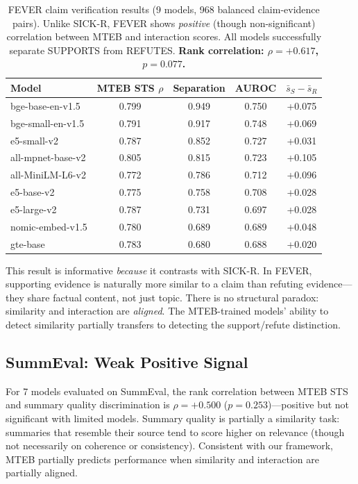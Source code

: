 \documentclass{article}
\begin{document}
\begin{table}[t]
\centering
\caption{FEVER claim verification results (9 models, 968 balanced claim-evidence pairs). Unlike SICK-R, FEVER shows \emph{positive} (though non-significant) correlation between MTEB and interaction scores. All models successfully separate SUPPORTS from REFUTES. \textbf{Rank correlation: $\rho = +0.617$, $p = 0.077$.}}
\label{tab:fever_results}
\small
\begin{tabular}{@{}lcccc@{}}
\toprule
\textbf{Model} & \textbf{MTEB STS $\rho$} & \textbf{Separation} & \textbf{AUROC} & $\bar{s}_S - \bar{s}_R$ \\
\midrule
bge-base-en-v1.5    & 0.799 & 0.949 & 0.750 & +0.075 \\
bge-small-en-v1.5   & 0.791 & 0.917 & 0.748 & +0.069 \\
e5-small-v2         & 0.787 & 0.852 & 0.727 & +0.031 \\
all-mpnet-base-v2   & 0.805 & 0.815 & 0.723 & +0.105 \\
all-MiniLM-L6-v2    & 0.772 & 0.786 & 0.712 & +0.096 \\
e5-base-v2          & 0.775 & 0.758 & 0.708 & +0.028 \\
e5-large-v2         & 0.787 & 0.731 & 0.697 & +0.028 \\
nomic-embed-v1.5    & 0.780 & 0.689 & 0.689 & +0.048 \\
gte-base            & 0.783 & 0.680 & 0.688 & +0.020 \\
\bottomrule
\end{tabular}
\end{table}

This result is informative \emph{because} it contrasts with SICK-R. In FEVER, supporting evidence is naturally more similar to a claim than refuting evidence---they share factual content, not just topic. There is no structural paradox: similarity and interaction are \emph{aligned}. The MTEB-trained models' ability to detect similarity partially transfers to detecting the support/refute distinction.

\subsection{SummEval: Weak Positive Signal}

For 7 models evaluated on SummEval, the rank correlation between MTEB STS and summary quality discrimination is $\rho = +0.500$ ($p = 0.253$)---positive but not significant with limited models. Summary quality is partially a similarity task: summaries that resemble their source tend to score higher on relevance (though not necessarily on coherence or consistency). Consistent with our framework, MTEB partially predicts performance when similarity and interaction are partially aligned.
\end{document}
